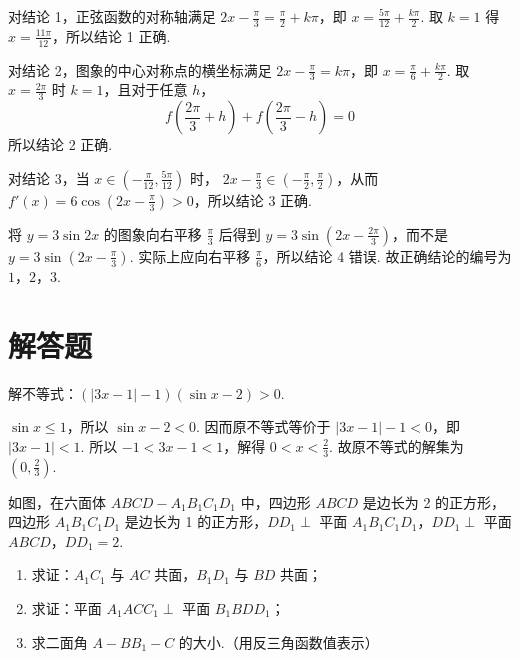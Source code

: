 \begin{solution}
对结论 1，正弦函数的对称轴满足
\(2x-\frac\pi3=\frac\pi2+k\pi\)，即
\(x=\frac{5\pi}{12}+\frac{k\pi}{2}\). 取 \(k=1\) 得
\(x=\frac{11\pi}{12}\)，所以结论 1 正确.

对结论 2，图象的中心对称点的横坐标满足
\(2x-\frac\pi3=k\pi\)，即 \(x=\frac\pi6+\frac{k\pi}{2}\). 取
\(x=\frac{2\pi}{3}\) 时 \(k=1\)，且对于任意 \(h\)，
\[
f\left(\frac{2\pi}{3}+h\right)+f\left(\frac{2\pi}{3}-h\right)=0
\]
所以结论 2 正确.

对结论 3，当 \(x\in\left(-\frac\pi{12},\frac{5\pi}{12}\right)\) 时，
\(2x-\frac\pi3\in\left(-\frac\pi2,\frac\pi2\right)\)，从而
\(f'(x)=6\cos\left(2x-\frac\pi3\right)>0\)，所以结论 3 正确.

将 \(y=3\sin2x\) 的图象向右平移 \(\frac\pi3\) 后得到
\(y=3\sin\left(2x-\frac{2\pi}{3}\right)\)，而不是
\(y=3\sin\left(2x-\frac\pi3\right)\). 实际上应向右平移 \(\frac\pi6\)，所以结论 4 错误.
故正确结论的编号为 \(1\)，\(2\)，\(3\).
\end{solution}

\section{解答题}

\begin{problem}
解不等式：\( (|3x-1|-1)(\sin x-2)>0 \).
\end{problem}

\begin{solution}
\(\sin x\leqslant 1\)，所以 \(\sin x-2<0\). 因而原不等式等价于 \(\lvert 3x-1\rvert-1<0\)，即 \(\lvert 3x-1\rvert<1\). 所以 \(-1<3x-1<1\)，解得 \(0<x<\frac{2}{3}\). 故原不等式的解集为 \(\left(0,\frac{2}{3}\right)\).
\end{solution}

\begin{problem}
如图，在六面体 \(ABCD - A_{1}B_{1}C_{1}D_{1}\) 中，四边形 \(ABCD\) 是边长为 2 的正方形，四边形 \(A_{1}B_{1}C_{1}D_{1}\) 是边长为 1 的正方形，\(DD_{1} \perp\) 平面 \(A_{1}B_{1}C_{1}D_{1}\)，\(DD_{1} \perp\) 平面 \(ABCD\)，\(DD_{1} = 2\).

\begin{enumerate}
\item 求证：\(A_{1}C_{1}\) 与 \(AC\) 共面，\(B_{1}D_{1}\) 与 \(BD\) 共面；
\item 求证：平面 \(A_{1}ACC_{1} \perp\) 平面 \(B_{1}BDD_{1}\)；
\item 求二面角 \(A - BB_{1} - C\) 的大小.（用反三角函数值表示）
\end{enumerate}

\end{problem}

